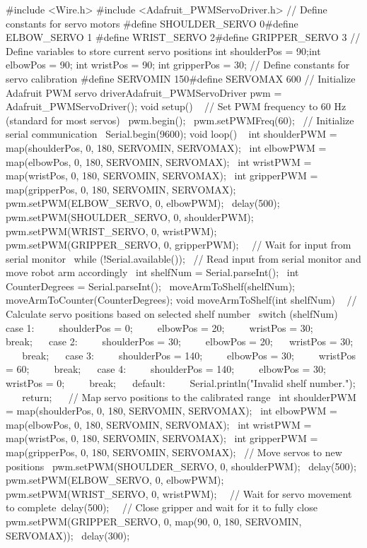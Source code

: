 #include <Wire.h>
#include <Adafruit_PWMServoDriver.h>
// Define constants for servo motors
#define SHOULDER_SERVO 0#define ELBOW_SERVO 1
#define WRIST_SERVO 2#define GRIPPER_SERVO 3
// Define variables to store current servo positions
int shoulderPos = 90;int elbowPos = 90;
int wristPos = 90;
int gripperPos = 30;
// Define constants for servo calibration
#define SERVOMIN 150#define SERVOMAX 600
// Initialize Adafruit PWM servo driverAdafruit_PWMServoDriver pwm = Adafruit_PWMServoDriver();
void setup() 
{ 
	// Set PWM frequency to 60 Hz (standard for most servos)  
	pwm.begin();  pwm.setPWMFreq(60); 
	// Initialize serial communication 
	Serial.begin(9600);
}
void loop() 
{  
	int shoulderPWM = map(shoulderPos, 0, 180, SERVOMIN, SERVOMAX);  
	int elbowPWM = map(elbowPos, 0, 180, SERVOMIN, SERVOMAX);  
	int wristPWM = map(wristPos, 0, 180, SERVOMIN, SERVOMAX); 
	int gripperPWM = map(gripperPos, 0, 180, SERVOMIN, SERVOMAX);   
	pwm.setPWM(ELBOW_SERVO, 0, elbowPWM);  
	delay(500);  
	pwm.setPWM(SHOULDER_SERVO, 0, shoulderPWM); 
	pwm.setPWM(WRIST_SERVO, 0, wristPWM);  
	pwm.setPWM(GRIPPER_SERVO, 0, gripperPWM);   
	// Wait for input from serial monitor  
	while (!Serial.available());  
	// Read input from serial monitor and move robot arm accordingly  
	int shelfNum = Serial.parseInt();  
	int CounterDegrees = Serial.parseInt();  
	moveArmToShelf(shelfNum);  
	moveArmToCounter(CounterDegrees);
}
void moveArmToShelf(int shelfNum) 
{ 
	// Calculate servo positions based on selected shelf number  switch (shelfNum) 
	{    case 1:      
		shoulderPos = 0;     
		elbowPos = 20;      
		wristPos = 30;     
		break;   
		case 2:     
		shoulderPos = 30;     
		elbowPos = 20;    
		wristPos = 30;     
		break;    
		case 3:     
		shoulderPos = 140;     
		elbowPos = 30;      
		wristPos = 60;     
		break;    
		case 4:     
		shoulderPos = 140;      
		elbowPos = 30;     
		wristPos = 0;      
		break;   
		default:      Serial.println("Invalid shelf number.");     
		return;  }  // Map servo positions to the calibrated range 
	int shoulderPWM = map(shoulderPos, 0, 180, SERVOMIN, SERVOMAX);  
	int elbowPWM = map(elbowPos, 0, 180, SERVOMIN, SERVOMAX);  
	int wristPWM = map(wristPos, 0, 180, SERVOMIN, SERVOMAX);  
	int gripperPWM = map(gripperPos, 0, 180, SERVOMIN, SERVOMAX);  // Move servos to new positions  
	pwm.setPWM(SHOULDER_SERVO, 0, shoulderPWM);  
	delay(500);  
	pwm.setPWM(ELBOW_SERVO, 0, elbowPWM);  
	pwm.setPWM(WRIST_SERVO, 0, wristPWM);  
	// Wait for servo movement to complete delay(500);  
	// Close gripper and wait for it to fully close 
	pwm.setPWM(GRIPPER_SERVO, 0, map(90, 0, 180, SERVOMIN, SERVOMAX));  
	delay(300); 
}
